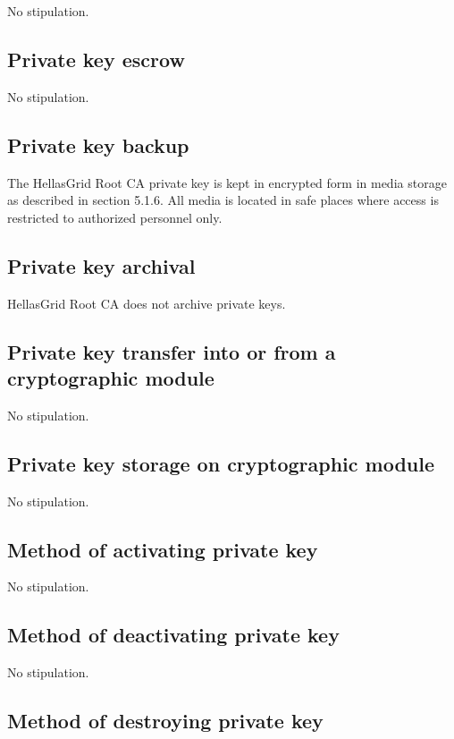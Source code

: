 \documentclass[11pt,a4paper,titlepage]{book}
\begin{document}
No stipulation. 

\subsection{Private key escrow}

No stipulation.

\subsection{Private key backup}

The HellasGrid Root CA private key is kept in encrypted form in media storage as described in section 5.1.6. All media is located in safe places where access is restricted to authorized personnel only.


\subsection{Private key archival}

HellasGrid Root CA does not archive private keys.

\subsection{Private key transfer into or from a cryptographic module}

No stipulation.

\subsection{Private key storage on cryptographic module}

No stipulation.

\subsection{Method of activating private key}

No stipulation.

\subsection{Method of deactivating private key}

No stipulation.

\subsection{Method of destroying private key}
\end{document}
